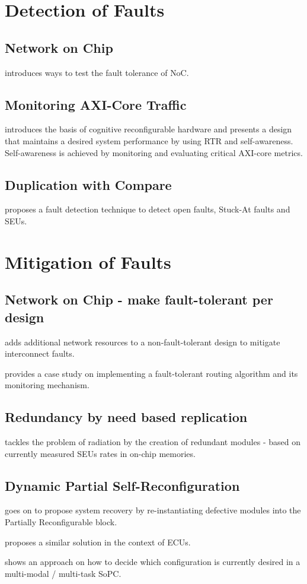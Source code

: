 \documentclass[10pt, journal]{IEEEtran}
\begin{document}
\section{Detection of Faults}
\subsection{Network on Chip}
\cite{sterpone_new_2012} introduces ways to test the fault tolerance of \gls{NoC}.
\subsection{Monitoring AXI-Core Traffic}
\cite{navas_towards_2015} introduces the basis of cognitive reconfigurable hardware and presents a design that maintains a desired system performance by using \gls{RTR} and self-awareness.
Self-awareness is achieved by monitoring and evaluating critical AXI-core metrics.

\subsection{Duplication with Compare}
\cite{alkady_dynamic_2015} proposes a fault detection technique to detect open faults, Stuck-At faults and \glspl{SEU}.

\section{Mitigation of Faults}
\subsection{Network on Chip - make fault-tolerant per design}
\cite{yesil_fpga_2016} adds additional network resources to a non-fault-tolerant design to mitigate interconnect faults.

\cite{lu_fault-tolerant_2015} provides a case study on implementing a fault-tolerant routing algorithm and its monitoring mechanism.
\subsection{Redundancy by need based replication}
\cite{glein_self-adaptive_2014} tackles the problem of radiation by the creation of redundant modules - based on currently measured \glspl{SEU} rates in on-chip memories.
\subsection{Dynamic Partial Self-Reconfiguration}
\cite{alkady_dynamic_2015} goes on to propose system recovery by re-instantiating defective modules into the Partially Reconfigurable block.

\cite{shanker_enhancing_nodate} proposes a similar solution in the context of \glspl{ECU}.

\cite{sharma_run-time_2018} shows an approach on how to decide which configuration is currently desired in a multi-modal / multi-task \gls{SoPC}.
\printglossaries 



\end{document}
